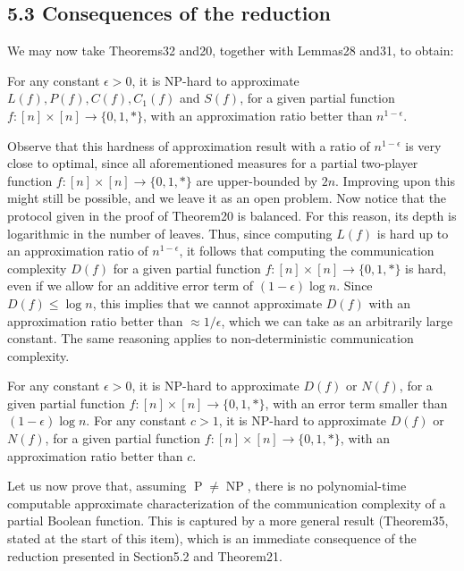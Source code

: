 \subsection*{5.3 Consequences of the reduction}
We may now take Theorems32 and20, together with Lemmas28 and31, to obtain:
\begin{ntcorollary}
For any constant $\epsilon>0$, it is NP-hard to approximate $L(f),P(f),C(f),C_1(f)$ and $S(f)$, for a given partial function $f:[n]\times[n]\to\{0,1,*\}$, with an approximation ratio better than $n^{1-\epsilon}$.
\end{ntcorollary}
Observe that this hardness of approximation result with a ratio of $n^{1-\epsilon}$ is very close to optimal, since all aforementioned measures for a partial two-player function $f:[n]\times[n]\to\{0,1,*\}$ are upper-bounded by $2n$. Improving upon this might still be possible, and we leave it as an open problem.
Now notice that the protocol given in the proof of Theorem20 is balanced. For this reason, its depth is logarithmic in the number of leaves. Thus, since computing $L(f)$ is hard up to an approximation ratio of $n^{1-\epsilon}$, it follows that computing the communication complexity $D(f)$ for a given partial function $f:[n]\times[n]\to\{0,1,*\}$ is hard, even if we allow for an additive error term of $(1-\epsilon)\log n$. Since $D(f)\leq\log n$, this implies that we cannot approximate $D(f)$ with an approximation ratio better than $\approx1/\epsilon$, which we can take as an arbitrarily large constant. The same reasoning applies to non-deterministic communication complexity.
\begin{ntcorollary}
For any constant $\epsilon>0$, it is NP-hard to approximate $D(f)$ or $N(f)$, for a given partial function $f:[n]\times[n]\to\{0,1,*\}$, with an error term smaller than $(1-\epsilon)\log n$. For any constant $c>1$, it is NP-hard to approximate $D(f)$ or $N(f)$, for a given partial function $f:[n]\times[n]\to\{0,1,*\}$, with an approximation ratio better than $c$.
\end{ntcorollary}
Let us now prove that, assuming $\operatorname P\ne\operatorname{NP}$, there is no polynomial-time computable approximate characterization of the communication complexity of a partial Boolean function. This is captured by a more general result (Theorem35, stated at the start of this item), which is an immediate consequence of the reduction presented in Section5.2 and Theorem21.
